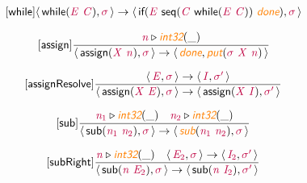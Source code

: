 \documentclass[10pt,leqno,fleqn]{article}
\newcommand{\artVariable}[1]{\mbox{\color{purple}\em #1\/}}
\newcommand{\artConstructor}[1]{\mbox{\sf #1}}
\newcommand{\artSpecial}[1]{\mbox{\color{orange}\sf\em #1}}
\begin{document}
\begin{equation}
\tag*{[\artConstructor{\sf while}]}
\begin{split}\langle\, \artConstructor{\sf while}(\artVariable{E}\ \artVariable{C}), \artVariable{$\sigma$}\,\rangle \rightarrow \langle\, \artConstructor{\sf if}(\artVariable{E}\ \artConstructor{\sf seq}(\artVariable{C}\ \artConstructor{\sf while}(\artVariable{E}\ \artVariable{C}))\ \artSpecial{done}), \artVariable{$\sigma$}\,\rangle 
\end{split}
\end{equation}

\begin{equation}
\tag*{[\artConstructor{\sf assign}]}
\begin{split}\frac{ \artVariable{n}\triangleright \artSpecial{int32}(\_) }{\langle\, \artConstructor{\sf assign}(\artVariable{X}\ \artVariable{n}), \artVariable{$\sigma$}\,\rangle \rightarrow \langle\, \artSpecial{done}, \artSpecial{put}(\artVariable{$\sigma$}\ \artVariable{X}\ \artVariable{n})\,\rangle }
\end{split}
\end{equation}

\begin{equation}
\tag*{[\artConstructor{\sf assignResolve}]}
\begin{split}\frac{\langle\, \artVariable{E}, \artVariable{$\sigma$}\,\rangle \rightarrow \langle\, \artVariable{I}, \artVariable{$\sigma$\/$^\prime$}\,\rangle }{\langle\, \artConstructor{\sf assign}(\artVariable{X}\ \artVariable{E}), \artVariable{$\sigma$}\,\rangle \rightarrow \langle\, \artConstructor{\sf assign}(\artVariable{X}\ \artVariable{I}), \artVariable{$\sigma$\/$^\prime$}\,\rangle }
\end{split}
\end{equation}

\begin{equation}
\tag*{[\artConstructor{\sf sub}]}
\begin{split}\frac{ \artVariable{n$_{1}$}\triangleright \artSpecial{int32}(\_) \quad  \artVariable{n$_{2}$}\triangleright \artSpecial{int32}(\_) }{\langle\, \artConstructor{\sf sub}(\artVariable{n$_{1}$}\ \artVariable{n$_{2}$}), \artVariable{$\sigma$}\,\rangle \rightarrow \langle\, \artSpecial{sub}(\artVariable{n$_{1}$}\ \artVariable{n$_{2}$}), \artVariable{$\sigma$}\,\rangle }
\end{split}
\end{equation}

\begin{equation}
\tag*{[\artConstructor{\sf subRight}]}
\begin{split}\frac{ \artVariable{n}\triangleright \artSpecial{int32}(\_) \quad \langle\, \artVariable{E$_{2}$}, \artVariable{$\sigma$}\,\rangle \rightarrow \langle\, \artVariable{I$_{2}$}, \artVariable{$\sigma$\/$^\prime$}\,\rangle }{\langle\, \artConstructor{\sf sub}(\artVariable{n}\ \artVariable{E$_{2}$}), \artVariable{$\sigma$}\,\rangle \rightarrow \langle\, \artConstructor{\sf sub}(\artVariable{n}\ \artVariable{I$_{2}$}), \artVariable{$\sigma$\/$^\prime$}\,\rangle }
\end{split}
\end{equation}
\end{document}
